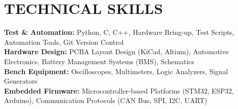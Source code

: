 \documentclass[letterpaper,11pt]{article}
\begin{document}
\section{TECHNICAL SKILLS}
 \begin{itemize}[leftmargin=0.15in, label={}]
    \small{\item{
     \textbf{Test \& Automation:} Python, C, C++, Hardware Bring-up, Test Scripts, Automation Tools, Git Version Control \\
     \textbf{Hardware Design:} PCBA Layout Design (KiCad, Altium), Automotive Electronics, Battery Management Systems (BMS), Schematics \\
     \textbf{Bench Equipment:} Oscilloscopes, Multimeters, Logic Analyzers, Signal Generators \\
     \textbf{Embedded Firmware:} Microcontroller-based Platforms (STM32, ESP32, Arduino), Communication Protocols (CAN Bus, SPI, I2C, UART)
    }}
 \end{itemize}


\end{document}

